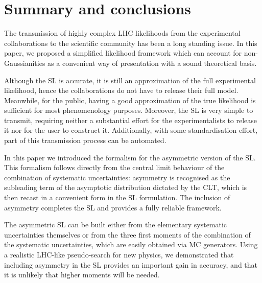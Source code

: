 \documentclass[11pt]{article}
\begin{document}
\section{Summary and conclusions}
\label{se:conclusions}


The transmission of highly complex LHC likelihoods from the experimental collaborations to the scientific community
has been a long standing issue. 
In this paper, we proposed a simplified likelihood framework which can account for non-Gaussianities as a convenient way of presentation 
with a sound theoretical basis. 

Although the SL is  accurate, it is still an approximation of the full experimental likelihood, hence the collaborations 
do not have to release their full %
model.
Meanwhile, for the public, having a good approximation of the true likelihood is sufficient for most phenomenology purposes. 
Moreover, the SL is very simple to transmit, requiring neither a substantial  effort for the experimentalists to release it nor for the user to construct it. Additionally, with some standardisation effort, part of this transmission process can be automated. 

In this paper we introduced the formalism for the asymmetric version of the SL. 
This formalism follows directly from the central limit behaviour of the combination of systematic uncertainties: asymmetry is recognised as the subleading term of the asymptotic distribution dictated by the CLT, which is then recast in a convenient form in the SL formulation. 
The inclusion of asymmetry completes the SL and provides a fully reliable framework.

The asymmetric SL can be built either from the elementary systematic uncertainties themselves or from the three first moments  of the combination of the systematic uncertainties, which are easily obtained via MC generators. 
Using a realistic LHC-like pseudo-search for new physics, we demonstrated that including asymmetry in the SL provides  
an important gain in accuracy, and  that it is unlikely that higher moments will be needed.
\end{document}
